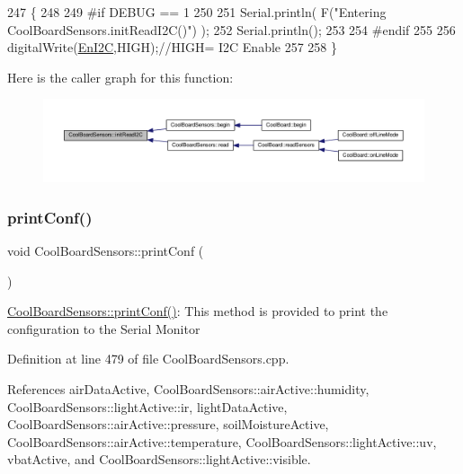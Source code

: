 \begin{DoxyCode}
247 \{
248 
249 \textcolor{preprocessor}{#if DEBUG == 1}
250 
251     Serial.println( F(\textcolor{stringliteral}{"Entering CoolBoardSensors.initReadI2C()"}) );
252     Serial.println();
253 
254 \textcolor{preprocessor}{#endif}
255  
256     digitalWrite(\hyperlink{classCoolBoardSensors_aaa6b5dbf3a6633bffd9d204d961096dc}{EnI2C},HIGH);\textcolor{comment}{//HIGH= I2C Enable}
257 
258 \}
\end{DoxyCode}
Here is the caller graph for this function\+:
\nopagebreak
\begin{figure}[H]
\begin{center}
\leavevmode
\includegraphics[width=350pt]{classCoolBoardSensors_acad6a8418c66d36868caca23c844ecb6_icgraph}
\end{center}
\end{figure}
\mbox{\label{classCoolBoardSensors_af6fd79505815b204c178617ecf54c873}} 
\subsubsection{\texorpdfstring{print\+Conf()}{printConf()}}
{\footnotesize\ttfamily void Cool\+Board\+Sensors\+::print\+Conf (\begin{DoxyParamCaption}{ }\end{DoxyParamCaption})}

\hyperlink{classCoolBoardSensors_af6fd79505815b204c178617ecf54c873}{Cool\+Board\+Sensors\+::print\+Conf()}\+: This method is provided to print the configuration to the Serial Monitor 

Definition at line 479 of file Cool\+Board\+Sensors.\+cpp.



References air\+Data\+Active, Cool\+Board\+Sensors\+::air\+Active\+::humidity, Cool\+Board\+Sensors\+::light\+Active\+::ir, light\+Data\+Active, Cool\+Board\+Sensors\+::air\+Active\+::pressure, soil\+Moisture\+Active, Cool\+Board\+Sensors\+::air\+Active\+::temperature, Cool\+Board\+Sensors\+::light\+Active\+::uv, vbat\+Active, and Cool\+Board\+Sensors\+::light\+Active\+::visible.



